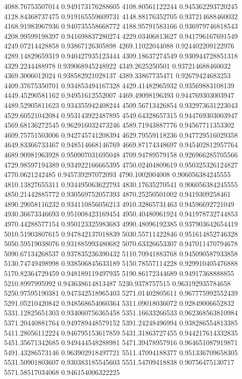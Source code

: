 {4088.76753507014 0.949173176288605
4108.80561122244 0.945362293720245
4128.84368737475 0.919165559609731
4148.88176352705 0.937214688460032
4168.91983967936 0.940735558668772
4188.95791583166 0.936979746818543
4208.99599198397 0.941698837280274
4229.03406813627 0.941796167691549
4249.07214428858 0.93867126305898
4269.11022044088 0.924402209122976
4289.14829659319 0.940427935123444
4309.18637274549 0.930944728851318
4329.2244488978 0.939068945248922
4349.2625250501 0.937214688460032
4369.3006012024 0.938582921028137
4389.33867735471 0.92679424683253
4409.37675350701 0.934853494167328
4429.41482965932 0.93569883108139
4449.45290581162 0.94951612552007
4469.49098196393 0.944769303003947
4489.52905811623 0.934355942408244
4509.56713426854 0.932973631223043
4529.60521042084 0.953143922487895
4549.64328657315 0.944769303003947
4569.68136272545 0.962916032473246
4589.71943887776 0.94567711353302
4609.75751503006 0.942745741208394
4629.79559118236 0.947729516029358
4649.83366733467 0.948514668146769
4669.87174348697 0.945402812957764
4689.90981963928 0.950907031695048
4709.94789579158 0.926966285705566
4729.98597194389 0.934922166665395
4750.02404809619 0.950325326124827
4770.0621242485 0.945739297072093
4790.1002004008 0.906056384245555
4810.13827655311 0.934495063622793
4830.17635270541 0.906056384245555
4850.21442885772 0.930569752057393
4870.25250501002 0.9419309258461
4890.29058116232 0.934110856056213
4910.32865731463 0.94596692721049
4930.36673346693 0.951008423169454
4950.40480961924 0.941978732744853
4970.44288577154 0.950123325983683
4990.48096192385 0.937903642654419
5010.51903807615 0.947842137018839
5030.55711422846 0.951614852746328
5050.59519038076 0.931885993480682
5070.63326653307 0.947011470794678
5090.67134268537 0.937835236390432
5110.70941883768 0.945090587933858
5130.74749498998 0.938506845633189
5150.78557114228 0.929910405476888
5170.82364729459 0.948189119497935
5190.86172344689 0.94917368888855
5210.8997995992 0.943638614813487
5230.9378757515 0.963192935784658
5250.97595190381 0.947342518965403
5271.01402805611 0.967775992552439
5291.05210420842 0.948568654060364
5311.09018036072 0.92849006652832
5331.12825651303 0.934060756365458
5351.16633266533 0.962368563810984
5371.20440881764 0.949789448579152
5391.24248496994 0.938286554813385
5411.28056112224 0.946795153617859
5431.31863727455 0.944217614332835
5451.35671342685 0.949444548288981
5471.39478957916 0.964651087919871
5491.43286573146 0.963902918497721
5511.47094188377 0.951336709658305
5531.50901803607 0.930383185545603
5551.54709418838 0.90756475130717
5571.58517034068 0.946154006322225
}
